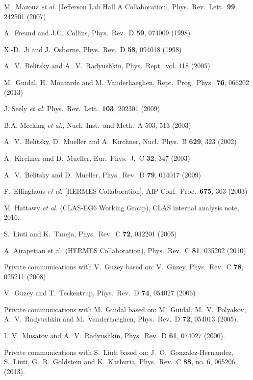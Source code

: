 \documentclass[nofootinbib,twocolumn,showpacs,prl,superscriptaddress,secnumarabic,amssymb,nobibnotes,aps,floatfix]{revtex4}
\begin{document}
\begin{thebibliography}{99}
  M.~Mazouz {\it et al.} [Jefferson Lab Hall A Collaboration],
   Phys.\ Rev.\ Lett.\  {\bf 99}, 242501 (2007)

A.~Freund and J.C.~Collins, Phys.\ Rev.\ D {\bf 59}, 074009 (1998)

   X.-D.~Ji and J.~Osborne, Phys.\ Rev.\ D {\bf 58}, 094018 (1998)

A.~V.~Belitsky and A.~V.~Radyushkin, Phys.\ Rept.\ vol. 418 (2005)

 M.~Guidal, H.~Moutarde and M.~Vanderhaeghen,
 Rept.\ Prog.\ Phys.\  {\bf 76}, 066202 (2013)

 J. Seely {\it et al.} Phys.\ Rev.\ Lett.\ {\bf 103}, 202301 (2009)

   B.A. Mecking {\it et al.}, Nucl.\ Inst.\ and Meth.\ A 503, 513 (2003)

 A.~V.~Belitsky, D.~Mueller and A.~Kirchner,
     Nucl.\ Phys.\ B {\bf 629}, 323 (2002)

   A.~Kirchner and D.~Mueller, Eur.\ Phys.\ J.\ C {\bf 32}, 347 (2003)

 A.~V.~Belitsky and D.~Mueller,
     Phys.\ Rev.\ D {\bf 79}, 014017 (2009)


 F.~Ellinghaus {\it et al.} [HERMES Collaboration],
  AIP Conf.\ Proc.\  {\bf 675}, 303 (2003)

M. Hattawy {\it et al.} (CLAS-EG6 Working Group), CLAS internal analysis note, 
2016.

   S.~Liuti and K.~Taneja, Phys.\ Rev.\ C {\bf 72}, 032201 (2005)

   A. Airapetian et al. (HERMES Collaboration), Phys.\ Rev.\ C {\bf 81}, 035202 
   (2010)

   Private communications with V.~Guzey based on: 
   V.~Guzey, Phys.\ Rev.\ C {\bf 78}, 025211 (2008).

 V.~Guzey and T.~Teckentrup,
     Phys.\ Rev.\ D {\bf 74}, 054027 (2006)

   Private communications with M.~Guidal based on: M.~Guidal, M.~V.~Polyakov, 
   A.~V.~Radyushkin and M.~Vanderhaeghen, Phys.\ Rev.\ D {\bf 72}, 054013
   (2005).

I.~V.~Musatov and A.~V.~Radyushkin, Phys.\ Rev.\ D {\bf 61}, 074027 (2000).

   Private communications with S.~Liuti based on: J.~O.~Gonzalez-Hernandez, 
   S.~Liuti, G.~R.~Goldstein and K.~Kathuria,
   Phys.\ Rev.\ C {\bf 88}, no. 6, 065206, (2013).


\end{thebibliography}
\end{document}
